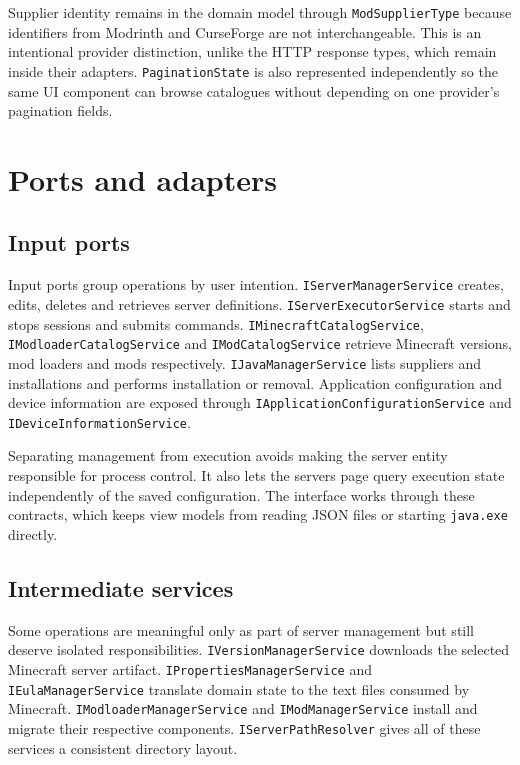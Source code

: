 Supplier identity remains in the domain model through \texttt{ModSupplierType} because identifiers from Modrinth and CurseForge are not interchangeable. This is an intentional provider distinction, unlike the HTTP response types, which remain inside their adapters. \texttt{PaginationState} is also represented independently so the same UI component can browse catalogues without depending on one provider's pagination fields.

\section{Ports and adapters}

\subsection{Input ports}

Input ports group operations by user intention. \texttt{IServerManagerService} creates, edits, deletes and retrieves server definitions. \texttt{IServerExecutorService} starts and stops sessions and submits commands. \texttt{IMinecraftCatalogService}, \texttt{IModloaderCatalogService} and \texttt{IModCatalogService} retrieve Minecraft versions, mod loaders and mods respectively. \texttt{IJavaManagerService} lists suppliers and installations and performs installation or removal. Application configuration and device information are exposed through \texttt{IApplicationConfigurationService} and \texttt{IDeviceInformationService}.

Separating management from execution avoids making the server entity responsible for process control. It also lets the servers page query execution state independently of the saved configuration. The interface works through these contracts, which keeps view models from reading JSON files or starting \texttt{java.exe} directly.

\subsection{Intermediate services}

Some operations are meaningful only as part of server management but still deserve isolated responsibilities. \texttt{IVersionManagerService} downloads the selected Minecraft server artifact. \texttt{IPropertiesManagerService} and \texttt{IEulaManagerService} translate domain state to the text files consumed by Minecraft. \texttt{IModloaderManagerService} and \texttt{IModManagerService} install and migrate their respective components. \texttt{IServerPathResolver} gives all of these services a consistent directory layout.

